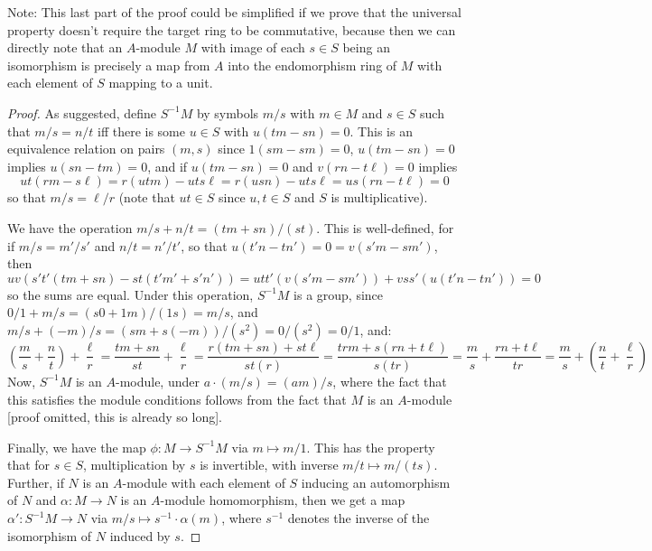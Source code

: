 \documentclass[12pt]{exam}
\begin{document}
Note: This last part of the proof could be simplified if we prove that the universal property doesn't require the target ring to be commutative, because then we can directly note that an $A$-module $M$ with image of each $s \in S$ being an isomorphism is precisely a map from $A$ into the endomorphism ring of $M$ with each element of $S$ mapping to a unit.

\begin{proof}
	As suggested, define $S^{-1}M$ by symbols $m/s$ with $m \in M$ and $s \in S$ such that $m/s = n/t$ iff there is some $u \in S$ with $u(tm-sn) = 0$. This is an equivalence relation on pairs $(m,s)$ since $1(sm-sm) = 0$, $u(tm-sn) = 0$ implies $u(sn-tm) = 0$, and if $u(tm-sn) = 0$ and $v(rn-t\ell)=0$ implies
	\[ ut(rm-s\ell) = r(utm)-uts\ell = r(usn)-uts\ell = us(rn-t\ell) = 0 \]
	so that $m/s = \ell/r$ (note that $ut \in S$ since $u,t \in S$ and $S$ is multiplicative).
	
	We have the operation $m/s + n/t = (tm+sn)/(st)$. This is well-defined, for if $m/s = m'/s'$ and $n/t = n'/t'$, so that $u(t'n - tn') = 0 = v(s'm - sm')$, then
	\[ uv(s't'(tm+sn) - st(t'm'+s'n')) = utt'(v(s'm-sm')) + vss'(u(t'n-tn')) = 0 \]
	so the sums are equal. Under this operation, $S^{-1}M$ is a group, since $0/1 + m/s = (s0 + 1m)/(1s) = m/s$, and $m/s + (-m)/s = (sm + s(-m))/(s^2) = 0/(s^2) = 0/1$, and:
	\[ \left(\frac{m}{s}+\frac{n}{t}\right)+\frac{\ell}{r} = \frac{tm+sn}{st}+\frac{\ell}{r} = \frac{r(tm+sn)+st\ell}{st(r)} = \frac{trm + s(rn+t\ell)}{s(tr)} = \frac{m}{s}+\frac{rn+t\ell}{tr} = \frac{m}{s}+\left(\frac{n}{t}+\frac{\ell}{r}\right) \]
	Now, $S^{-1}M$ is an $A$-module, under $a \cdot (m/s) = (am)/s$, where the fact that this satisfies the module conditions follows from the fact that $M$ is an $A$-module [proof omitted, this is already so long].
	
	Finally, we have the map $\phi : M \to S^{-1}M$ via $m \mapsto m/1$. This has the property that for $s \in S$, multiplication by $s$ is invertible, with inverse $m/t \mapsto m/(ts)$. Further, if $N$ is an $A$-module with each element of $S$ inducing an automorphism of $N$ and $\alpha : M \to N$ is an $A$-module homomorphism, then we get a map $\alpha' : S^{-1}M \to N$ via $m/s \mapsto s^{-1} \cdot \alpha(m)$, where $s^{-1}$ denotes the inverse of the isomorphism of $N$ induced by $s$.
\end{proof}
\end{document}
